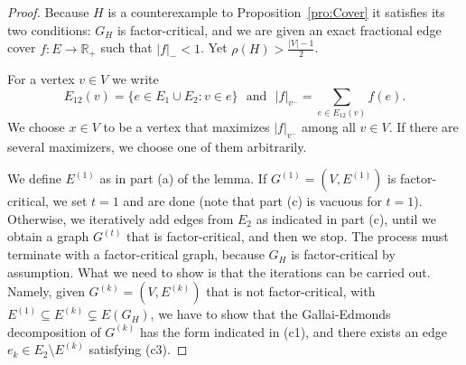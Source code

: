 \documentclass[10pt,a4paper]{amsart}
\begin{document}
\begin{proof} Because $H$ is a counterexample to Proposition~\ref{pro:Cover} it satisfies its two conditions: $G_H$ is factor-critical, and we are given an exact fractional edge cover $f: E \to \mathbb{R}_+$ such that $|f|_- < 1$. Yet $\rho(H) > \frac{|V|-1}{2}$.

For a vertex $v \in V$ we write \[ E_{12}(v) = \{ e \in E_1 \cup E_2: v \in e\}\,\, \textrm { and } \,\,|f|_{v^-} = \sum_{e \in E_{12}(v)} f(e).\] We choose $x \in V$ to be a vertex that maximizes $|f|_{v^-}$ among all $v \in V$. If there are several maximizers, we choose one of them arbitrarily.

We define $E^{(1)}$ as in part (a) of the lemma. If $G^{(1)} = (V, E^{(1)})$ is factor-critical, we set $t=1$ and are done (note that part (c) is vacuous for $t=1$). Otherwise, we iteratively add edges from $E_2$ as indicated in part (c), until we obtain a graph $G^{(t)}$ that is factor-critical, and then we stop. The process must terminate with a factor-critical graph, because $G_H$ is factor-critical by assumption. What we need to show is that the iterations can be carried out. Namely, given $G^{(k)} = (V, E^{(k)})$ that is not factor-critical, with $E^{(1)} \subseteq E^{(k)} \subsetneq E(G_H)$, we have to show that the Gallai-Edmonds decomposition of $G^{(k)}$ has the form indicated in (c1), and there exists an edge $e_k \in E_2 \setminus E^{(k)}$ satisfying (c3).


\end{proof}
\end{document}
